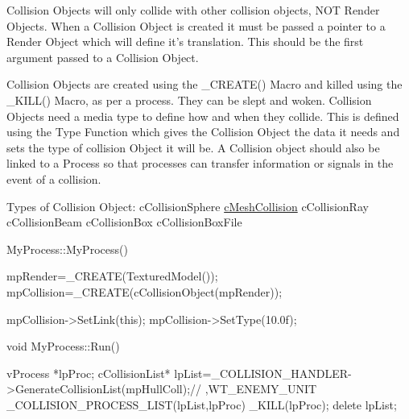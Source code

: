 Collision Objects will only collide with other collision objects, NOT Render Objects. When a Collision Object is created it must be passed a pointer to a Render Object which will define it's translation. This should be the first argument passed to a Collision Object.

Collision Objects are created using the \_\-CREATE() Macro and killed using the \_\-KILL() Macro, as per a process. They can be slept and woken. Collision Objects need a media type to define how and when they collide. This is defined using the Type Function which gives the Collision Object the data it needs and sets the type of collision Object it will be. A Collision object should also be linked to a Process so that processes can transfer information or signals in the event of a collision.

Types of Collision Object: cCollisionSphere \hyperlink{classc_mesh_collision}{cMeshCollision} cCollisionRay cCollisionBeam cCollisionBox cCollisionBoxFile


\begin{DoxyCode}
 MyProcess::MyProcess()
 {
  mpRender=_CREATE(TexturedModel());
  mpCollision=_CREATE(cCollisionObject(mpRender));

  mpCollision->SetLink(this);
  mpCollision->SetType(10.0f);
 }

 void MyProcess::Run()
 {
  vProcess *lpProc;
  cCollisionList* lpList=_COLLISION_HANDLER->GenerateCollisionList(mpHullColl);//
      ,WT_ENEMY_UNIT
        _COLLISION_PROCESS_LIST(lpList,lpProc)
        {
                                _KILL(lpProc);
        }
        delete lpList;

 }
\end{DoxyCode}
 